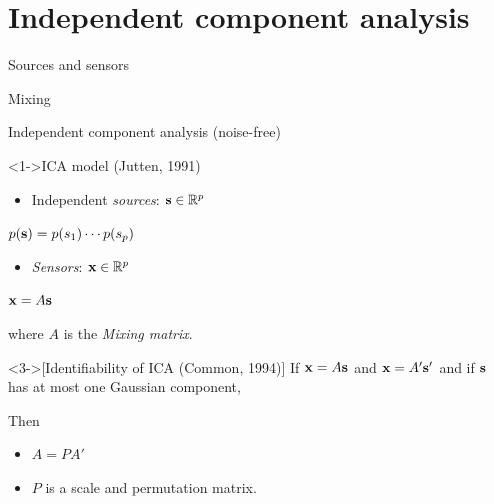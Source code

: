 \documentclass[bigger]{beamer}
\begin{document}
\section{Independent component analysis}
\begin{frame}{Sources and sensors}
  \centering
\end{frame}
\begin{frame}{Mixing}
  \centering
\end{frame}
\begin{frame}{Independent component analysis (noise-free)}
\begin{block}<1->{ICA model (Jutten, 1991)}
\begin{itemize}
\item Independent \emph{sources}: \(\mathbf{s} \in \mathbb{R}^{p}\)
\end{itemize}
\(p(\mathbf{s}) = p(s_1) \cdots p(s_p)\)
\begin{itemize}
\item \emph{\emph{Sensors}}: \(\mathbf{x} \in \mathbb{R}^{p}\)
\end{itemize}

\centering
\emph{\emph{\(\mathbf{x} = A\mathbf{s}\)}}

where \(A\) is the \emph{Mixing matrix}. 
\end{block}

\begin{theorem}<3->[Identifiability of ICA (Common, 1994)]
  If \(\mathbf{x} = A \mathbf{s}\) and \(\mathbf{x} = A' \mathbf{s}'\)
  and if $\mathbf{s}$ has at most one Gaussian component,

Then 
\begin{itemize}
\item \(A = P A'\)
\item \(P\) is a scale and permutation matrix.
\end{itemize}
\end{theorem}
\end{frame}
\end{document}
